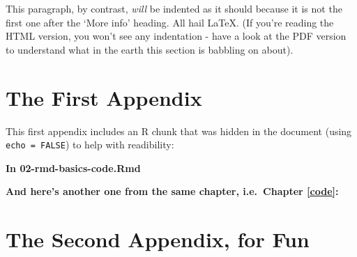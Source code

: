 \documentclass[a4paper, nobind]{templates/ociamthesis}
\newcommand*{\bibtitle}{References}
\begin{document}
This paragraph, by contrast, \emph{will} be indented as it should because it is not the first one after the `More info' heading.
All hail LaTeX. (If you're reading the HTML version, you won't see any indentation - have a look at the PDF version to understand what in the earth this section is babbling on about).

\startappendices

\hypertarget{the-first-appendix}{%
\chapter{The First Appendix}\label{the-first-appendix}}

This first appendix includes an R chunk that was hidden in the document (using \texttt{echo\ =\ FALSE}) to help with readibility:

\textbf{In 02-rmd-basics-code.Rmd}

\textbf{And here's another one from the same chapter, i.e.~Chapter \ref{code}:}

\hypertarget{the-second-appendix-for-fun}{%
\chapter{The Second Appendix, for Fun}\label{the-second-appendix-for-fun}}




\setlength{\baselineskip}{0pt} %

{\renewcommand*\MakeUppercase[1]{#1}%
\printbibliography[heading=bibintoc,title={\bibtitle}]}
\end{document}
